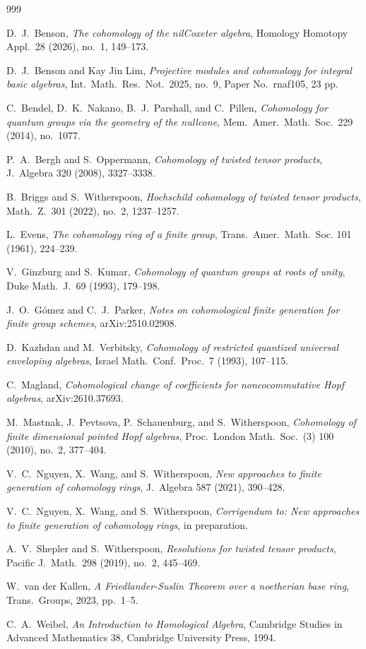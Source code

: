 \documentclass[11pt]{amsart}
\numberwithin{equation}{section}
\theoremstyle{definition}
\theoremstyle{remark}
\begin{document}
\begin{thebibliography}{999}

  D.~J.~Benson,
  {\em The cohomology of the nilCoxeter algebra},
  Homology Homotopy Appl.~28 (2026), no.~1, 149--173. 

  D.~J.~Benson and Kay Jin Lim,
  {\em Projective modules and cohomology for integral basic algebras},
  Int.~Math.~Res.~Not.~2025, no.~9, Paper No.~rnaf105, 23 pp.

C.~Bendel, D.~K.~Nakano, B.~J.~Parshall, and C.~Pillen,
{\em Cohomology for quantum groups via the geometry of the nullcone},
Mem.~Amer.~Math.~Soc.~229 (2014), no.~1077.

P.~A.~Bergh and S.~Oppermann,
{\em Cohomology of twisted tensor products},
J.~Algebra 320 (2008), 3327--3338.

B.~Briggs and S.~Witherspoon,
{\em Hochschild cohomology of twisted tensor products},
Math.~Z.~301 (2022), no.~2, 1237--1257.

L.~Evens, {\em The cohomology ring of a finite group},
Trans.~Amer.~Math.~Soc. 101 (1961), 224--239. 

V.~Ginzburg and S.~Kumar,
{\em Cohomology of quantum groups at roots of unity},
Duke Math.~J.~69 (1993), 179--198.

J.~O.~G\'omez and C.~J.~Parker,
{\em Notes on cohomological finite generation for finite group schemes},
arXiv:2510.02908. 

D.~Kazhdan and M.~Verbitsky,
{\em Cohomology of restricted quantized universal enveloping algebras},
Israel Math.~Conf.~Proc.~7 (1993), 107--115.

  C.~Magland,
  {\em Cohomological change of coefficients for noncocommutative
    Hopf algebras}, arXiv:2610.37693. 

 M.~Mastnak, J.~Pevtsova, P.~Schauenburg, and S.~Witherspoon,
  {\em Cohomology of finite dimensional pointed Hopf algebras},
  Proc.~London Math.~Soc.~(3) 100 (2010), no.~2, 377--404. 

  V.~C.~Nguyen, X.~Wang, and S.~Witherspoon,
  {\em New approaches to finite generation of cohomology rings},
  J.~Algebra 587 (2021), 390--428.

  V.~C.~Nguyen, X.~Wang, and S.~Witherspoon,
  {\em Corrigendum to: New approaches to finite generation of cohomology rings},
  in preparation. 

A.~V.~Shepler and S.~Witherspoon,
{\em Resolutions for twisted tensor products},
Pacific J.~Math.~298 (2019), no.~2, 445--469. 

W.~van der Kallen,
{\em A Friedlander-Suslin Theorem over a noetherian base ring},
Trans.~Groups, 2023, pp.~1--5. 

  C.~A.~Weibel,
  {\em An Introduction to Homological Algebra},
  Cambridge Studies in Advanced Mathematics 38,
  Cambridge University Press, 1994. 

\end{thebibliography}
\end{document}

